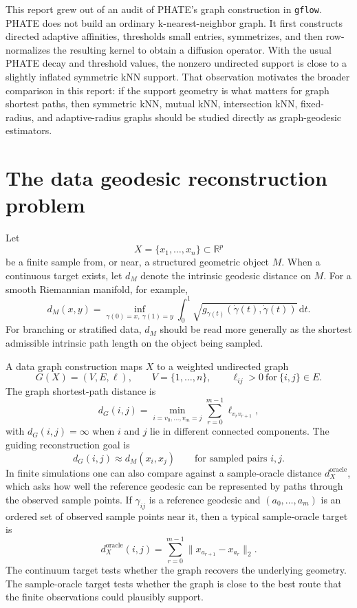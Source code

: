 \documentclass[11pt]{article}
\newcommand{\R}{\mathbb{R}}
\newcommand{\dd}{\mathrm{d}}
\begin{document}
This report grew out of an audit of PHATE's graph construction in \texttt{gflow}.  PHATE
does not build an ordinary k-nearest-neighbor graph.  It first constructs directed adaptive
affinities, thresholds small entries, symmetrizes, and then row-normalizes the resulting
kernel to obtain a diffusion operator.  With the usual PHATE decay and threshold values,
the nonzero undirected support is close to a slightly inflated symmetric kNN support.  That
observation motivates the broader comparison in this report: if the support geometry is
what matters for graph shortest paths, then symmetric kNN, mutual kNN, intersection kNN,
fixed-radius, and adaptive-radius graphs should be studied directly as graph-geodesic
estimators.

\section{The data geodesic reconstruction problem}

Let
\[
  X=\{x_1,\ldots,x_n\}\subset \R^p
\]
be a finite sample from, or near, a structured geometric object \(M\).  When a continuous
target exists, let \(d_M\) denote the intrinsic geodesic distance on \(M\).  For a smooth
Riemannian manifold, for example,
\[
  d_M(x,y)
  =
  \inf_{\gamma(0)=x,\ \gamma(1)=y}
  \int_0^1
  \sqrt{g_{\gamma(t)}(\dot{\gamma}(t),\dot{\gamma}(t))}\,\dd t .
\]
For branching or stratified data, \(d_M\) should be read more generally as the shortest
admissible intrinsic path length on the object being sampled.

A data graph construction maps \(X\) to a weighted undirected graph
\[
  G(X)=(V,E,\ell),
  \qquad
  V=\{1,\ldots,n\},
  \qquad
  \ell_{ij}>0\ \text{for}\ \{i,j\}\in E.
\]
The graph shortest-path distance is
\[
  d_G(i,j)
  =
  \min_{i=v_0,\ldots,v_m=j}
  \sum_{r=0}^{m-1} \ell_{v_r v_{r+1}},
\]
with \(d_G(i,j)=\infty\) when \(i\) and \(j\) lie in different connected components.  The
guiding reconstruction goal is
\[
  d_G(i,j) \approx d_M(x_i,x_j)
  \qquad \text{for sampled pairs } i,j.
\]
In finite simulations one can also compare against a sample-oracle distance
\(d_X^{\mathrm{oracle}}\), which asks how well the reference geodesic can be represented by
paths through the observed sample points.  If \(\gamma_{ij}\) is a reference geodesic and
\((a_0,\ldots,a_m)\) is an ordered set of observed sample points near it, then a typical
sample-oracle target is
\[
  d_X^{\mathrm{oracle}}(i,j)
  =
  \sum_{r=0}^{m-1}
  \|x_{a_{r+1}}-x_{a_r}\|_2 .
\]
The continuum target tests whether the graph recovers the underlying geometry.  The
sample-oracle target tests whether the graph is close to the best route that the finite
observations could plausibly support.
\end{document}
